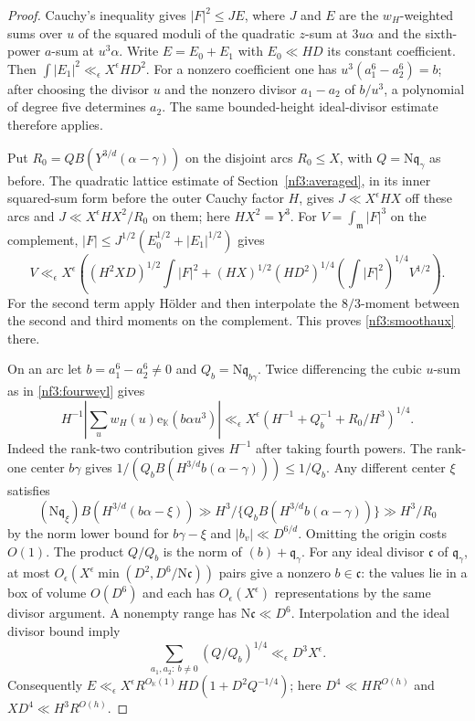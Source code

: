\documentclass[11pt,letterpaper]{article}
\theoremstyle{definition}
\numberwithin{equation}{section}
\begin{document}
\begin{proof}
Cauchy's inequality gives $|F|^2\le J E$, where $J$ and $E$
are the $w_H$-weighted sums over $u$ of the squared moduli of
the quadratic $z$-sum at $3u\alpha$ and the sixth-power $a$-sum
at $u^3\alpha$. Write $E=E_0+E_1$ with $E_0\ll HD$ its constant
coefficient. Then $\int|E_1|^2\ll_\epsilon X^\epsilon H D^2$.
For a nonzero coefficient one has
$u^3(a_1^6-a_2^6)=b$; after choosing the divisor $u$ and the
nonzero divisor $a_1-a_2$ of $b/u^3$, a polynomial of degree five
determines $a_2$. The same bounded-height ideal-divisor estimate
therefore applies.

Put $R_0=Q B(Y^{3/d}(\alpha-\gamma))$ on the disjoint arcs
$R_0\le X$, with $Q=\mathrm N\mathfrak q_\gamma$ as before.
The quadratic lattice estimate of Section~\ref{nf3:averaged}, in its inner squared-sum form before the outer Cauchy factor $H$, gives
$J\ll X^\epsilon HX$ off these arcs and
$J\ll X^\epsilon HX^2/R_0$ on them; here $HX^2=Y^3$.
For $V=\int_{\mathfrak m}|F|^3$ on the complement,
$|F|\le J^{1/2}(E_0^{1/2}+|E_1|^{1/2})$ gives
\[
 V\ll_\epsilon X^\epsilon\left(
   (H^2XD)^{1/2}\int |F|^2+
   (HX)^{1/2}(HD^2)^{1/4}
   (\int|F|^2)^{1/4} V^{1/2}\right).
\]
For the second term apply H\"older and then interpolate the
$8/3$-moment between the second and third moments on the
complement. This proves \eqref{nf3:smoothaux} there.

On an arc let $b=a_1^6-a_2^6\ne0$ and $Q_b=\mathrm N\mathfrak q_{b\gamma}$.
Twice differencing the cubic $u$-sum as in \eqref{nf3:fourweyl} gives
\[
 H^{-1}\left|\sum_{u}w_H(u)\mathrm e_{\mathbb K}(b\alpha u^3)\right|
    \ll_\epsilon X^\epsilon
      (H^{-1}+Q_b^{-1}+R_0/H^3)^{1/4}.
\]
Indeed the rank-two contribution gives $H^{-1}$ after taking
fourth powers. The rank-one center $b\gamma$ gives
$1/(Q_b B(H^{3/d}b(\alpha-\gamma)))\le1/Q_b$.
Any different center $\xi$ satisfies
\[
 (\mathrm N\mathfrak q_\xi) B(H^{3/d}(b\alpha-\xi))\gg
 H^3/\{Q_b B(H^{3/d} b(\alpha-\gamma))\}\gg H^3/R_0
\]
by the norm lower bound for $b\gamma-\xi$ and
$|b_v|\ll D^{6/d}$. Omitting the origin costs $O(1)$.
The product $Q/Q_b$ is the norm of
$(b)+\mathfrak q_\gamma$. For any ideal divisor $\mathfrak c$ of
$\mathfrak q_\gamma$, at most
$O_\epsilon(X^\epsilon\min(D^2,D^6/\mathrm N\mathfrak c))$
pairs give a nonzero $b\in\mathfrak c$: the values lie in a box
of volume $O(D^6)$ and each has $O_\epsilon(X^\epsilon)$
representations by the same divisor argument. A nonempty range
has $\mathrm N\mathfrak c\ll D^6$. Interpolation and the ideal
divisor bound imply
\[
 \sum_{a_1,a_2:\ b\ne0}(Q/Q_b)^{1/4}
                         \ll_\epsilon D^3 X^\epsilon.
\]
Consequently
$E\ll_\epsilon X^\epsilon R^{O_{\mathbb K}(1)}HD
 (1+D^2 Q^{-1/4})$; here $D^4\ll H R^{O(h)}$ and
$XD^4\ll H^3R^{O(h)}$.


\end{proof}
\end{document}
